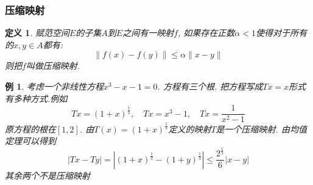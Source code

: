\documentclass[a4paper,11pt]{article}
\newtheorem{definition}{\hspace{2em}定义}[section]
\newtheorem{example}{例}[section]
\begin{document}
\subsubsection*{压缩映射}
\begin{definition}
  赋范空间$E$的子集$A$到$E$之间有一映射$f$, 如果存在正数$\alpha<1$使得对于所有的$x,y\in A$都有:
  \begin{equation*}
    \|f(x)-f(y)\|\leq\alpha\|x-y\|
  \end{equation*}
  则把$f$叫做压缩映射.
\end{definition}
\begin{example}
  考虑一个非线性方程$x^3-x-1=0$. 方程有三个根. 把方程写成$Tx=x$形式有多种方式.例如
  \begin{equation*}
    Tx=(1+x)^{\frac{1}{3}},\quad Tx=x^3-1,\quad Tx=\frac{1}{x^2-1}
  \end{equation*}
  原方程的根在$[1,2]$. 由$T(x)=(1+x)^{\frac{1}{3}}$定义的映射$T$是一个压缩映射. 由均值定理可以得到
  \begin{equation*}
    |Tx-Ty|=|(1+x)^{\frac{1}{3}}-(1+y)^{\frac{1}{3}}|\leq\frac{2^{\frac{1}{3}}}{6}|x-y|
  \end{equation*}
  其余两个不是压缩映射
\end{example}
\end{document}
